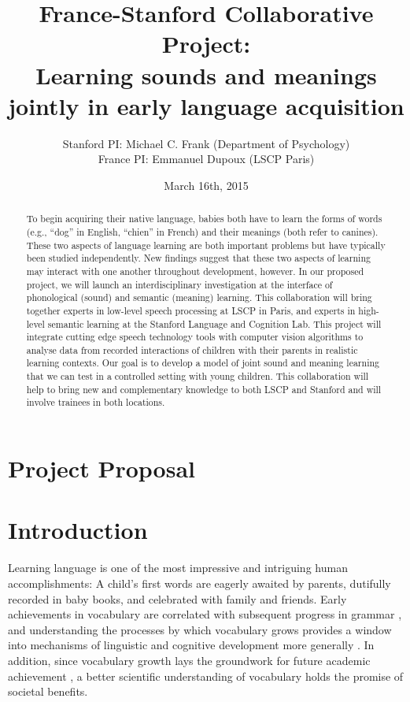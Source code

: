 \documentclass[12pt]{article}
\title{France-Stanford Collaborative Project: \\
Learning sounds and meanings jointly in early language acquisition}
\author{Stanford PI: Michael C. Frank (Department of Psychology) \\
France PI: Emmanuel Dupoux (LSCP Paris)}
\date{March 16th, 2015}
\begin{document}
\maketitle

\begin{abstract}
\noindent To begin acquiring their native language, babies both have to learn the forms of words (e.g., ``dog'' in English, ``chien'' in French) and their meanings (both refer to canines). These two aspects of language learning are both important problems but have typically been studied independently. New findings suggest that these two aspects of learning may interact with one another throughout development, however. In our proposed project, we will launch an interdisciplinary investigation at the interface of phonological (sound) and semantic (meaning) learning. This collaboration will bring together experts in low-level speech processing at LSCP in Paris, and experts in high-level semantic learning at the Stanford Language and Cognition Lab. This project will integrate cutting edge speech technology tools with computer vision algorithms to analyse data from recorded interactions of children with their parents in realistic learning contexts. Our goal is to develop a model of joint sound and meaning learning that we can test in a controlled setting with young children. This collaboration will help to bring new and complementary knowledge to both LSCP and Stanford and will involve trainees in both locations.
\end{abstract}

\newpage

\section*{\centering Project Proposal}

\section{Introduction}


Learning language is one of the most impressive and intriguing human accomplishments: A child's first words are eagerly awaited by parents, dutifully recorded in baby books, and celebrated with family and friends. Early achievements in vocabulary are correlated with subsequent progress in grammar \cite{bates1999}, and understanding the processes by which vocabulary grows provides a window into mechanisms of linguistic and cognitive development more generally \cite{bloom2002}. In addition, since vocabulary growth lays the groundwork for future academic achievement \cite{hart1995,marchman2008}, a better scientific understanding of vocabulary holds the promise of societal benefits.
\end{document}
